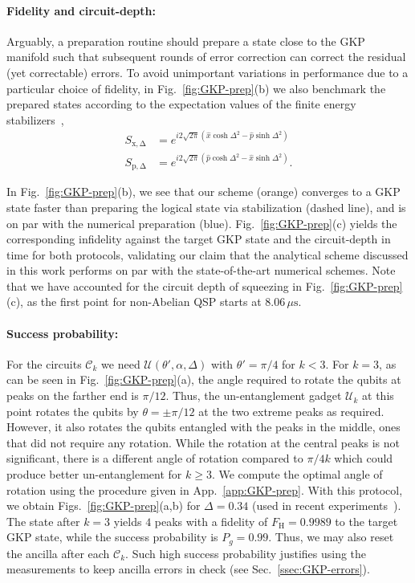 \documentclass[aps,prx,showpacs,notitlepage,twocolumn,superscriptaddress,nofootinbib,preprintnumbers,floatfix,10pt, longbibliography]{revtex4-2}
\begin{document}
\paragraph{Fidelity and circuit-depth:} 
Arguably, a preparation routine should prepare a state close to the GKP manifold such that subsequent rounds of error correction can correct the residual (yet correctable) errors. To avoid unimportant variations in performance due to a particular choice of fidelity, in Fig.~\ref{fig:GKP-prep}(b) we also benchmark the prepared states according to the expectation values of the finite energy stabilizers~\cite{royer2020stabilization},
\begin{align}
  S_\mathrm{x,\Delta}&=e^{i2\sqrt{2\pi}(\hat x\cosh{\Delta^2}-\hat p\sinh{\Delta^2})}\label{eq:GKP-stab-x}\\
  S_\mathrm{p,\Delta}&=e^{i2\sqrt{2\pi}(\hat p\cosh{\Delta^2}-\hat x\sinh{\Delta^2})}\label{eq:GKP-stab-p}.
\end{align}

In Fig.~\ref{fig:GKP-prep}(b), we see that our scheme (orange) converges to a GKP state faster than preparing the logical state via stabilization (dashed line), and is on par with the numerical preparation (blue). Fig.~\ref{fig:GKP-prep}(c) yields the corresponding infidelity against the target GKP state and the circuit-depth in time for both protocols, validating our claim that the analytical scheme discussed in this work performs on par with the state-of-the-art numerical schemes. Note that we have accounted for the circuit depth of squeezing in Fig.~\ref{fig:GKP-prep}(c), as the first point for non-Abelian QSP starts at $8.06\,\mu\textrm{s}$.

\paragraph{Success probability:} For the circuits $\mathcal{C}_k$ we need $\mathcal{U}(\theta',\alpha,\Delta)$ with $\theta'=\pi/4$ for $k<3$. For $k=3$, as can be seen in Fig.~\ref{fig:GKP-prep}(a), the angle required to rotate the qubits at peaks on the farther end is $\pi/12$. Thus, the un-entanglement gadget $\mathcal{U}_k$ at this point rotates the qubits by $\theta=\pm\pi/12$ at the two extreme peaks as required. However, it also rotates the qubits entangled with the peaks in the middle, ones that did not require any rotation. While the rotation at the central peaks is not significant, there is a different angle of rotation compared to $\pi/4k$ which could produce better un-entanglement for $k\ge 3$. We compute the optimal angle of rotation using the procedure given in App.~\ref{app:GKP-prep}. With this protocol, we obtain Figs.~\ref{fig:GKP-prep}(a,b) for $\Delta=0.34$ (used in recent experiments~\cite{eickbusch2022fast,sivak2023real}). The state after $k=3$ yields $4$ peaks with a fidelity of $F_\mathrm{H}=0.9989$ to the target GKP state, while the success probability is $P_g=0.99$. Thus, we may also reset the ancilla after each $\mathcal{C}_k$. Such high success probability justifies using the measurements to keep ancilla errors in check (see Sec.~\ref{ssec:GKP-errors}). 
\end{document}

